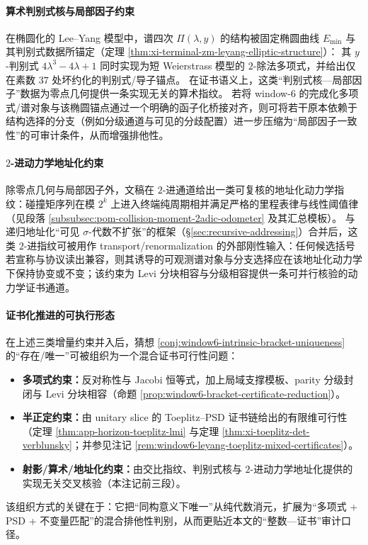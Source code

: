 \begin{remark}
\paragraph{算术判别式核与局部因子约束}
在椭圆化的 Lee--Yang 模型中，谱四次 \(\Pi(\lambda,y)\) 的结构被固定椭圆曲线 \(E_{\min}\) 与其判别式数据所锚定（定理 \ref{thm:xi-terminal-zm-leyang-elliptic-structure}）：
其 \(y\)-判别式 \(4\lambda^3-4\lambda+1\) 同时实现为短 Weierstrass 模型的 \(2\)-除法多项式，并给出仅在素数 \(37\) 处坏约化的判别式/导子锚点。
在证书语义上，这类“判别式核—局部因子”数据为零点几何提供一条实现无关的算术指纹。
若将 window-\(6\) 的完成化多项式/谱对象与该椭圆锚点通过一个明确的函子化桥接对齐，则可将若干原本依赖于结构选择的分支（例如分级通道与可见的分歧配置）进一步压缩为“局部因子一致性”的可审计条件，从而增强排他性。

\paragraph{\(2\)-进动力学地址化约束}
除零点几何与局部因子外，文稿在 \(2\)-进通道给出一类可复核的地址化动力学指纹：碰撞矩序列在模 \(2^k\) 上进入终端纯周期相并满足严格的里程表律与线性阈值律（见段落 \ref{subsubsec:pom-collision-moment-2adic-odometer} 及其汇总模板）。
与递归地址化“可见 \(\sigma\)-代数不扩张”的框架（\S\ref{sec:recursive-addressing}）合并后，这类 \(2\)-进指纹可被用作 transport/renormalization 的外部刚性输入：任何候选括号若宣称与协议读出兼容，则其诱导的可观测谱对象与分支选择应在该地址化动力学下保持协变或不变；该约束为 Levi 分块相容与分级相容提供一条可并行核验的动力学证书通道。

\paragraph{证书化推进的可执行形态}
在上述三类增量约束并入后，猜想 \ref{conj:window6-intrinsic-bracket-uniqueness} 的“存在/唯一”可被组织为一个混合证书可行性问题：
\begin{itemize}
  \item \textbf{多项式约束：}反对称性与 Jacobi 恒等式，加上局域支撑模板、parity 分级封闭与 Levi 分块相容（命题 \ref{prop:window6-bracket-certificate-reduction}）。
  \item \textbf{半正定约束：}由 unitary slice 的 Toeplitz--PSD 证书链给出的有限维可行性（定理 \ref{thm:app-horizon-toeplitz-lmi} 与定理 \ref{thm:xi-toeplitz-det-verblunsky}；并参见注记 \ref{rem:window6-leyang-toeplitz-mixed-certificates}）。
  \item \textbf{射影/算术/地址化约束：}由交比指纹、判别式核与 \(2\)-进动力学地址化提供的实现无关交叉核验（本注记前三段）。
\end{itemize}
该组织方式的关键在于：它把“同构意义下唯一”从纯代数消元，扩展为“多项式 + PSD + 不变量匹配”的混合排他性判别，从而更贴近本文的“整数—证书”审计口径。


\end{remark}

